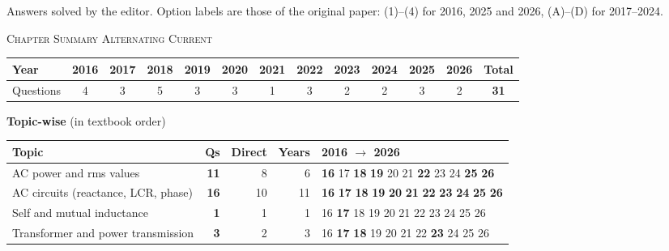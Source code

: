 {\footnotesize Answers solved by the editor. Option labels are those of the original paper: (1)--(4) for 2016, 2025 and 2026, (A)--(D) for 2017--2024.
}\par
\par{}\vspace{14pt}
\begin{center}{}\par
{\large\color{navy}\scshape Chapter Summary \textperiodcentered{} Alternating Current}\end{center}
{\small\setlength{\tabcolsep}{3.5pt}
\begin{tabular*}{\linewidth}{@{\extracolsep{\fill}}l*{11}{c}c@{}}\toprule
Year & 2016 & 2017 & 2018 & 2019 & 2020 & 2021 & 2022 & 2023 & 2024 & 2025 & 2026 & Total\\\midrule
Questions & 4 & 3 & 5 & 3 & 3 & 1 & 3 & 2 & 2 & 3 & 2 & \textbf{31}\\\bottomrule\end{tabular*}}\par\medskip
{\small\textbf{\color{crimson}Topic-wise} (in textbook order)\par\smallskip
\begin{tabularx}{\linewidth}{@{}>{\raggedright\arraybackslash}Xrrrl@{}}\toprule
Topic & Qs & Direct & Years & 2016 $\rightarrow$ 2026\\\midrule
AC power and rms values & \textbf{11} & 8 & 6 & {\scriptsize \textbf{16} {\color{gray!45}17} \textbf{18} \textbf{19} {\color{gray!45}20} {\color{gray!45}21} \textbf{22} {\color{gray!45}23} {\color{gray!45}24} \textbf{25} \textbf{26}}\\
AC circuits (reactance, LCR, phase) & \textbf{16} & 10 & 11 & {\scriptsize \textbf{16} \textbf{17} \textbf{18} \textbf{19} \textbf{20} \textbf{21} \textbf{22} \textbf{23} \textbf{24} \textbf{25} \textbf{26}}\\
Self and mutual inductance & \textbf{1} & 1 & 1 & {\scriptsize {\color{gray!45}16} \textbf{17} {\color{gray!45}18} {\color{gray!45}19} {\color{gray!45}20} {\color{gray!45}21} {\color{gray!45}22} {\color{gray!45}23} {\color{gray!45}24} {\color{gray!45}25} {\color{gray!45}26}}\\
Transformer and power transmission & \textbf{3} & 2 & 3 & {\scriptsize {\color{gray!45}16} \textbf{17} \textbf{18} {\color{gray!45}19} {\color{gray!45}20} {\color{gray!45}21} {\color{gray!45}22} \textbf{23} {\color{gray!45}24} {\color{gray!45}25} {\color{gray!45}26}}\\
\bottomrule\end{tabularx}}\par\medskip
